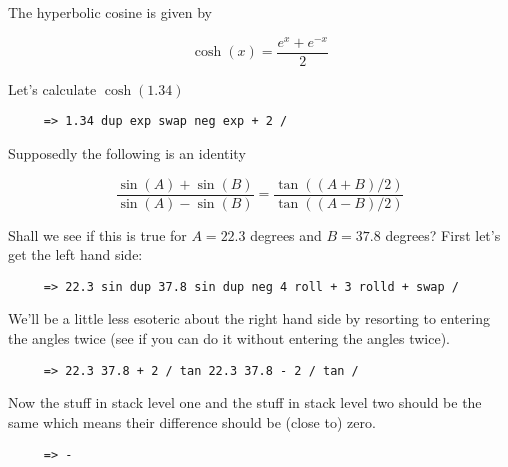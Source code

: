 The hyperbolic cosine is given by

\begin{displaymath}
     \cosh (x) = \frac{ e^{x} + e^{-x} }{ 2 }
\end{displaymath}

Let's calculate $\cosh(1.34)$

\begin{verbatim}
     => 1.34 dup exp swap neg exp + 2 /
\end{verbatim}

Supposedly the following is an identity

\begin{displaymath}
     \frac { \sin(A) + \sin(B) }{ \sin(A) - \sin(B) } =
       \frac { \tan((A+B)/2) }{ \tan((A-B)/2) }
\end{displaymath}

Shall we see if this is true for $A = 22.3$ degrees and $B = 37.8$ degrees? First let's get the
left hand side:

\begin{verbatim}
     => 22.3 sin dup 37.8 sin dup neg 4 roll + 3 rolld + swap /
\end{verbatim}

We'll be a little less esoteric about the right hand side by resorting to entering the angles
twice (see if you can do it without entering the angles twice).

\begin{verbatim}
     => 22.3 37.8 + 2 / tan 22.3 37.8 - 2 / tan /
\end{verbatim}

Now the stuff in stack level one and the stuff in stack level two should be the same which means
their difference should be (close to) zero.

\begin{verbatim}
     => -
\end{verbatim}
